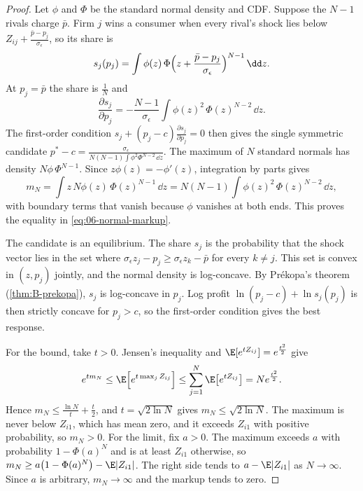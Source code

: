 \begin{proof}
Let $\phi$ and $\Phi$ be the standard normal density and CDF. Suppose the $N - 1$ rivals charge $\bar p$. Firm $j$ wins
a consumer when every rival's shock lies below $Z_{ij} + \frac{\bar p - p_j}{\sigma_\epsilon}$, so its share is
\begin{equation*}
  s_j(p_j) = \int \phi(z)\,\Phi\Bigl(z + \frac{\bar p - p_j}{\sigma_\epsilon}\Bigr)^{N-1}\,\dd z .
\end{equation*}
At $p_j = \bar p$ the share is $\frac{1}{N}$ and
\begin{equation*}
  \frac{\partial s_j}{\partial p_j} = -\frac{N-1}{\sigma_\epsilon}\int \phi(z)^2\,\Phi(z)^{N-2}\,\dd z .
\end{equation*}
The first-order condition $s_j + (p_j - c)\frac{\partial s_j}{\partial p_j} = 0$ then gives the single symmetric
candidate $p^* - c = \frac{\sigma_\epsilon}{N(N-1)\int \phi^2\Phi^{N-2}\,\dd z}$. The maximum of $N$ standard normals
has density $N\phi\,\Phi^{N-1}$. Since $z\phi(z) = -\phi'(z)$, integration by parts gives
\begin{equation*}
  m_N = \int z\,N\phi(z)\,\Phi(z)^{N-1}\,\dd z = N(N-1)\int \phi(z)^2\,\Phi(z)^{N-2}\,\dd z ,
\end{equation*}
with boundary terms that vanish because $\phi$ vanishes at both ends. This proves the equality in
\eqref{eq:06-normal-markup}.

The candidate is an equilibrium. The share $s_j$ is the probability that the shock vector lies in the set where
$\sigma_\epsilon z_j - p_j \ge \sigma_\epsilon z_k - \bar p$ for every $k \ne j$. This set is convex in $(z, p_j)$
jointly, and the normal density is log-concave. By Pr\'ekopa's theorem (\cref{thm:B-prekopa}), $s_j$ is log-concave in
$p_j$. Log profit $\ln(p_j - c) + \ln s_j(p_j)$ is then strictly concave for $p_j > c$, so the first-order condition
gives the best response.

For the bound, take $t > 0$. Jensen's inequality and $\E[e^{tZ_{ij}}] = e^{\frac{t^2}{2}}$ give
\begin{equation*}
  e^{t m_N} \le \E\Bigl[e^{t \max_j Z_{ij}}\Bigr] \le \sum_{j=1}^{N} \E\bigl[e^{t Z_{ij}}\bigr] = N e^{\frac{t^2}{2}} .
\end{equation*}
Hence $m_N \le \frac{\ln N}{t} + \frac{t}{2}$, and $t = \sqrt{2\ln N}$ gives $m_N \le \sqrt{2\ln N}$. The maximum is never
below $Z_{i1}$, which has mean zero, and it exceeds $Z_{i1}$ with positive probability, so $m_N > 0$. For the limit, fix
$a > 0$. The maximum exceeds $a$ with probability $1 - \Phi(a)^N$ and is at least $Z_{i1}$ otherwise, so
$m_N \ge a\bigl(1 - \Phi(a)^N\bigr) - \E|Z_{i1}|$. The right side tends to $a - \E|Z_{i1}|$ as $N \to \infty$. Since $a$ is arbitrary, $m_N \to \infty$ and
the markup tends to zero.
\end{proof}

